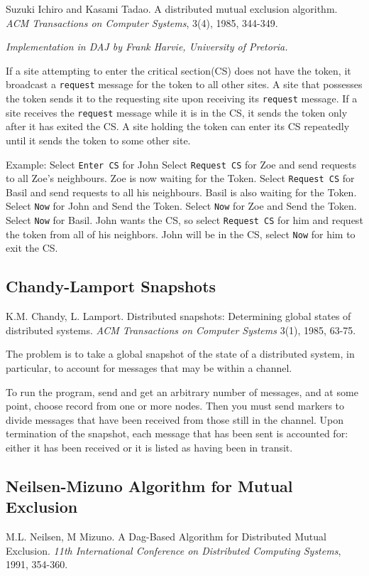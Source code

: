 \documentclass[11pt]{article}
\newcommand{\p}[1]{\texttt{#1}}
\begin{document}
Suzuki Ichiro and Kasami Tadao.
A distributed mutual exclusion algorithm.
\emph{ACM Transactions on Computer Systems}, 3(4), 1985, 344-349.

\emph{Implementation in DAJ by Frank Harvie, University of Pretoria.}


If a site attempting to enter the critical section(CS) does not have
the token, it broadcast a \p{request} message for the token to all other sites.
A site that possesses
the token sends it to the requesting site upon receiving its \p{request}
message. If a site receives the \p{request} message while it is in the CS,
it sends the token only
after it has exited the CS. A site holding the token can enter its
CS repeatedly until it sends the token to some other site.

Example:
Select \p{Enter CS} for John
Select \p{Request CS} for Zoe and send requests to all Zoe's neighbours.
Zoe is now waiting for the Token.
Select \p{Request CS} for Basil and send requests to all his neighbours.
Basil is also waiting for the Token.
Select \p{Now} for John and Send the Token.
Select \p{Now} for Zoe and Send the Token.
Select \p{Now} for Basil.
John wants the CS, so select \p{Request CS} for him and request the token
from all of his neighbors.
John will be in the CS, select \p{Now} for him to exit the CS.

\subsection{Chandy-Lamport Snapshots}

K.M. Chandy, L. Lamport.
Distributed snapshots: Determining global
states of distributed systems.
\emph{ACM Transactions on Computer Systems} 3(1), 1985, 63-75.

The problem is to take a global snapshot of the state of a
distributed system, in particular, to account for messages that
may be within a channel.

To run the program, send and get an arbitrary number of messages,
and at some point, choose record from one or more nodes. Then
you must send markers to divide messages that have been received
from those still in the channel. Upon termination of the
snapshot, each message that has been sent is accounted for:
either it has been received or it is listed as having been in
transit.

\subsection{Neilsen-Mizuno Algorithm for Mutual Exclusion}
M.L. Neilsen, M Mizuno.
A Dag-Based Algorithm for Distributed Mutual Exclusion.
\emph{11th International Conference on Distributed Computing Systems}, 1991, 354-360.
\end{document}

